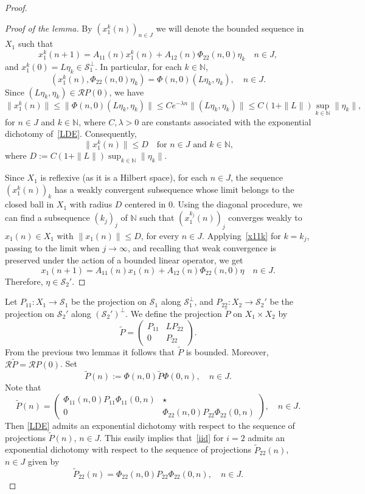 \documentclass[10pt,a4paper]{amsart}
\begin{document}
\begin{proof}
\begin{proof}[Proof of the lemma]
By $(x_1^k(n))_{n\in J}$ we will denote the bounded sequence in $X_1$ such that 
\begin{equation}\label{x11k}
    x_1^k(n+1)=A_{11}(n)x_1^k(n)+A_{12}(n)\Phi_{22}(n, 0)\eta_k \quad n\in J,
\end{equation}
and $x_1^k(0)=L\eta_k \in \mathcal S_1^\perp$. In particular, for each $k\in \mathbb N$,
\[
(x_1^k(n), \Phi_{22}(n, 0)\eta_k)=\Phi(n, 0)(L\eta_k, \eta_k), \quad n\in J.
\]
Since $(L\eta_k, \eta_k)\in \mathcal R P(0)$, we have
\[
\|x_1^k(n)\| \le \|\Phi(n, 0)(L\eta_k, \eta_k)\| \le Ce^{-\lambda n} \|(L\eta_k, \eta_k)\| \le C(1+\|L\|)\sup_{k\in \mathbb N}\|\eta_k\|,
\]
for $n\in J$ and $k\in \mathbb N$, where $C, \lambda>0$ are constants associated with the exponential dichotomy of~\eqref{LDE}. Consequently, 
\[
\|x_1^k(n)\| \le D \quad \text{for $n\in J$ and $k\in \mathbb N$,}
\]
where $D:=C(1+\|L\|)\sup_{k\in \mathbb N}\|\eta_k\|$.

Since $X_1$ is reflexive (as it is a Hilbert space), for each $n\in J$, the sequence $(x_1^k(n))_k$ has a weakly convergent subsequence whose limit belongs to the closed ball in $X_1$ with radius $D$ centered in $0$. Using the diagonal procedure, we can find a subsequence $(k_j)_j$ of $\mathbb N$ such that $(x_1^{k_j}(n))_j$ converges weakly to $x_1(n)\in X_1$ with $\|x_1(n)\| \le D$, for every $n\in J$.
Applying~\eqref{x11k} for $k=k_j$, passing to the limit when $j\to \infty$, and recalling that weak convergence is preserved under the action of a bounded linear operator, we get
\[
x_1(n+1)=A_{11}(n)x_1(n)+A_{12}(n)\Phi_{22}(n, 0)\eta \quad n\in J.
\]
Therefore, $\eta\in \mathcal S_2'$. 
\end{proof}
Let $P_{11} \colon X_1\to \mathcal S_1$ be the projection on $\mathcal S_1$ along $\mathcal S_1^\perp$, and $P_{22}\colon X_2 \to \mathcal S_2'$ be the projection on $\mathcal S_2'$ along $(\mathcal S_2')^\perp$. We define the projection $\tilde P$ on $X_1\times X_2$ by 
\begin{equation}\label{tildeP}
\tilde P=\begin{pmatrix}
P_{11} & LP_{22}\\
0 &P_{22}
\end{pmatrix}.
\end{equation}
From the previous two lemmas it follows that $\tilde P$ is bounded. Moreover, $\mathcal R\tilde P=\mathcal RP(0)$. Set
\[
\tilde P(n):= \Phi(n, 0)\tilde P\Phi(0, n), \quad n\in J.
\]
Note that 
\[
\tilde P(n)=\begin{pmatrix}
\Phi_{11}(n, 0)P_{11}\Phi_{11}(0, n) & \star\\
0 &\Phi_{22}(n, 0)P_{22}\Phi_{22}(0, n)
\end{pmatrix}, \quad n\in J.
\]
Then \eqref{LDE} admits an exponential dichotomy with respect to the sequence of projections $\tilde P(n)$, $n\in J$. This easily implies that~\eqref{iid} for $i=2$ admits an exponential dichotomy with respect to the sequence of projections $\tilde P_{22}(n)$, $n\in J$ given by 
\[
\tilde P_{22}(n)=\Phi_{22}(n, 0)P_{22}\Phi_{22}(0, n), \quad n\in J.\]
\end{proof}
\end{document}
